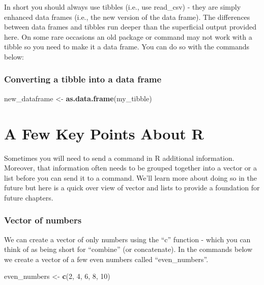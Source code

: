 \documentclass[
]{krantz}
\makeatletter
\newenvironment{Shaded}{\begin{snugshade}}{\end{snugshade}}
\newcommand{\DecValTok}[1]{\textcolor[rgb]{0.06,0.06,0.06}{#1}}
\newcommand{\KeywordTok}[1]{\textcolor[rgb]{0.27,0.27,0.27}{\textbf{#1}}}
\newcommand{\NormalTok}[1]{#1}
\newcommand{\StringTok}[1]{\textcolor[rgb]{0.5,0.5,0.5}{#1}}
\newenvironment{kframe}{%
\medskip{}
\setlength{\fboxsep}{.8em}
 \def\at@end@of@kframe{}%
 \ifinner\ifhmode%
  \def\at@end@of@kframe{\end{minipage}}%
  \begin{minipage}{\columnwidth}%
 \fi\fi%
 \def\FrameCommand##1{\hskip\@totalleftmargin \hskip-\fboxsep
 \colorbox{shadecolor}{##1}\hskip-\fboxsep
     \hskip-\linewidth \hskip-\@totalleftmargin \hskip\columnwidth}%
 \MakeFramed {\advance\hsize-\width
   \@totalleftmargin\z@ \linewidth\hsize
   \@setminipage}}%
 {\par\unskip\endMakeFramed%
 \at@end@of@kframe}
\renewenvironment{Shaded}{\begin{kframe}}{\end{kframe}}
\makeatother
\begin{document}
In short you should always use tibbles (i.e., use read\_csv) - they are simply enhanced data frames (i.e., the new version of the data frame). The differences between data frames and tibbles run deeper than the superficial output provided here. On some rare occasions an old package or command may not work with a tibble so you need to make it a data frame. You can do so with the commands below:

\hypertarget{converting-a-tibble-into-a-data-frame}{%
\subsubsection{Converting a tibble into a data frame}\label{converting-a-tibble-into-a-data-frame}}

\begin{Shaded}
\begin{Highlighting}[]
\NormalTok{new_dataframe <-}\StringTok{ }\KeywordTok{as.data.frame}\NormalTok{(my_tibble)}
\end{Highlighting}
\end{Shaded}

\hypertarget{a-few-key-points-about-r}{%
\section{A Few Key Points About R}\label{a-few-key-points-about-r}}

Sometimes you will need to send a command in R additional information. Moreover, that information often needs to be grouped together into a vector or a list before you can send it to a command. We'll learn more about doing so in the future but here is a quick over view of vector and lists to provide a foundation for future chapters.

\hypertarget{vector-of-numbers}{%
\subsubsection{Vector of numbers}\label{vector-of-numbers}}

We can create a vector of only numbers using the ``c'' function - which you can think of as being short for ``combine'' (or concatenate). In the commands below we create a vector of a few even numbers called ``even\_numbers''.

\begin{Shaded}
\begin{Highlighting}[]
\NormalTok{even_numbers <-}\StringTok{ }\KeywordTok{c}\NormalTok{(}\DecValTok{2}\NormalTok{, }\DecValTok{4}\NormalTok{, }\DecValTok{6}\NormalTok{, }\DecValTok{8}\NormalTok{, }\DecValTok{10}\NormalTok{)}
\end{Highlighting}
\end{Shaded}
\end{document}
